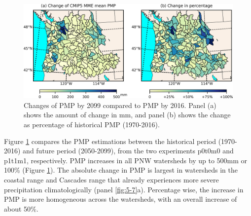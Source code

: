 \begin{figure}[htbp]
	\includegraphics[width=\linewidth]{pics/ch5/fig8.jpg}
	\caption{Changes of PMP by 2099 compared to PMP by 2016. Panel (a) shows the amount of change in mm, and panel (b) shows the change as percentage of historical PMP (1970-2016).}
	\label{fig:5-8}
\end{figure}

Figure \ref{fig:5-8} compares the PMP estimations between the historical period (1970-2016) and future period (2050-2099), from the two experiments p0t0m0 and p1t1m1, respectively. PMP increases in all PNW watersheds by up to 500mm or 100\% (Figure \ref{fig:5-8}). The absolute change in PMP is largest in watersheds in the coastal range and Cascades range that already experiences more severe precipitation climatologically (panel \ref{fig:5-7}a). Percentage wise, the increase in PMP is more homogeneous across the watersheds, with an overall increase of about 50\%.

